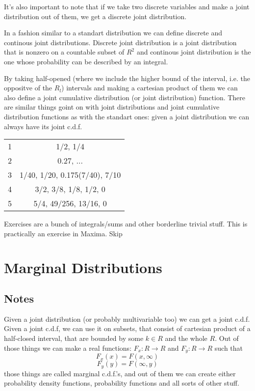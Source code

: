 \documentclass[11pt,oneside,titlepage]{book}
\begin{document}
It's also important to note that if we take two discrete variables and
make a joint distribution out of them, we get a discrete joint
distribution.

In a fashion similar to a standart distribution we can define discrete
and continous joint distributions. Discrete joint distribution is a
joint distribution that is nonzero on a countable subset of $R^2$ and
continous joint distribution is the one whose probability can be
described by an integral. 

By taking half-opened (where we include the higher bound of the
interval, i.e. the oppositve of the $R_l$) intervals and making a
cartesian product of them we can also define a joint cumulative
distribution (or joint distribution) function.
There are similar things goint on with joint distributions and
joint cumulative distribution functions as with the standart ones:
given a joint distribution we can always have its joint c.d.f.

\begin{tabular}[center]{||c | c|| }
  \hline
  1 & 1/2, 1/4 \\
  2 & 0.27, ... \\
  3 & 1/40, 1/20, 0.175(7/40), 7/10 \\
  4 & 3/2, 3/8, 1/8, 1/2, 0 \\
  5 & 5/4, 49/256, 13/16, 0\\
  \hline 
\end{tabular}

Exercises are a bunch of integrals/sums and other borderline trivial stuff. This is practically
an exercise in Maxima. Skip

\section{Marginal Distributions}

\subsection*{Notes}

Given a joint distribution (or probably multivariable too) we can
get a joint c.d.f. Given a joint c.d.f, we can use it on subsets, that
consist of cartesian product of a half-closed interval, that are bounded by some $k \in R$
and the whole $R$. Out of those things we can make a real functions:
$F_x: R \to R$ and $F_y: R \to R$ such that
$$F_x(x) = F(x, \infty)$$
$$F_y(y) = F(\infty, y)$$
those things are called marginal c.d.f.'s, and out of them we can create either probability
density functions, probability functions and all sorts of other stuff.
\end{document}
